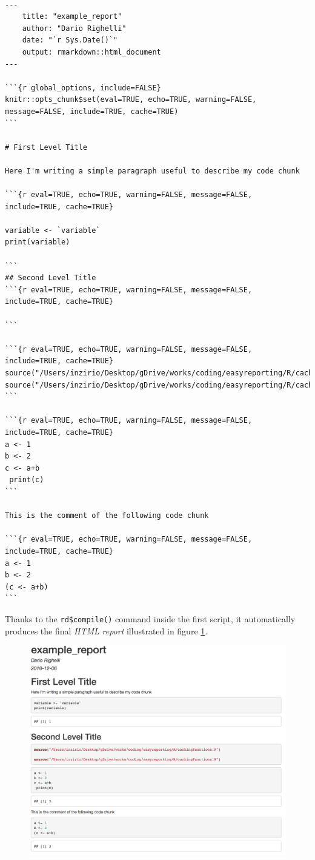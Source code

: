 \begin{lstlisting}

---
    title: "example_report"
    author: "Dario Righelli"
    date: "`r Sys.Date()`"
    output: rmarkdown::html_document
---

```{r global_options, include=FALSE}
knitr::opts_chunk$set(eval=TRUE, echo=TRUE, warning=FALSE, message=FALSE, include=TRUE, cache=TRUE)
```

# First Level Title

Here I'm writing a simple paragraph useful to describe my code chunk

```{r eval=TRUE, echo=TRUE, warning=FALSE, message=FALSE, include=TRUE, cache=TRUE}

variable <- `variable`
print(variable)

```
## Second Level Title
```{r eval=TRUE, echo=TRUE, warning=FALSE, message=FALSE, include=TRUE, cache=TRUE}

```

```{r eval=TRUE, echo=TRUE, warning=FALSE, message=FALSE, include=TRUE, cache=TRUE}
source("/Users/inzirio/Desktop/gDrive/works/coding/easyreporting/R/cachingFunctions.R")
source("/Users/inzirio/Desktop/gDrive/works/coding/easyreporting/R/cachingFunctions.R")
```

```{r eval=TRUE, echo=TRUE, warning=FALSE, message=FALSE, include=TRUE, cache=TRUE}
a <- 1
b <- 2
c <- a+b
 print(c)
```

This is the comment of the following code chunk

```{r eval=TRUE, echo=TRUE, warning=FALSE, message=FALSE, include=TRUE, cache=TRUE}
a <- 1
b <- 2
(c <- a+b)
```

\end{lstlisting}

Thanks to the \lstinline!rd$compile()! command inside the first script, it automatically produces the final \textit{HTML} \textit{report} illustrated in figure \ref{fig:rrreport}.

\begin{figure}[H]
\includegraphics[width=\textwidth, keepaspectratio]{img/rr/report.png}
\caption[html report]{}
\label{fig:rrreport}
\centering
\end{figure}